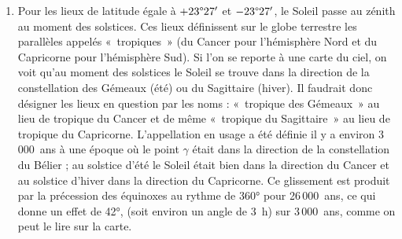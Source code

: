 \documentclass[a4paper,10pt]{report}
\renewcommand{\deg}{\ensuremath{\degree}}
\begin{document}
\begin{Answer}
\begin{enumerate}
  \item Pour les lieux de latitude égale à $+23\deg27'$ et
    $-23\deg27'$, le Soleil passe au zénith au moment des
    solstices. Ces lieux définissent sur le globe terrestre les
    parallèles appelés «~tropiques~» (du Cancer pour l'hémisphère Nord
    et du Capricorne pour l'hémisphère Sud). Si l'on se reporte à une
    carte du ciel, on voit qu'au moment des solstices le Soleil se
    trouve dans la direction de la constellation des Gémeaux (été) ou
    du Sagittaire (hiver). Il faudrait donc désigner les lieux en
    question par les noms : «~tropique des Gémeaux~» au lieu de
    tropique du Cancer et de même «~tropique du Sagittaire~» au lieu
    de tropique du Capricorne. L'appellation en usage a été définie il
    y a environ 3\,000~ans à une époque où le point $\gamma$ était
    dans la direction de la constellation du Bélier ; au solstice
    d'été le Soleil était bien dans la direction du Cancer et au
    solstice d'hiver dans la direction du Capricorne. Ce glissement
    est produit par la précession des équinoxes au rythme de 360° pour
    26\,000~ans, ce qui donne un effet de 42°, (soit environ un angle
    de 3~h) sur 3\,000~ans, comme on peut le lire sur la carte.
\end{enumerate}
\end{Answer}
\end{document}
